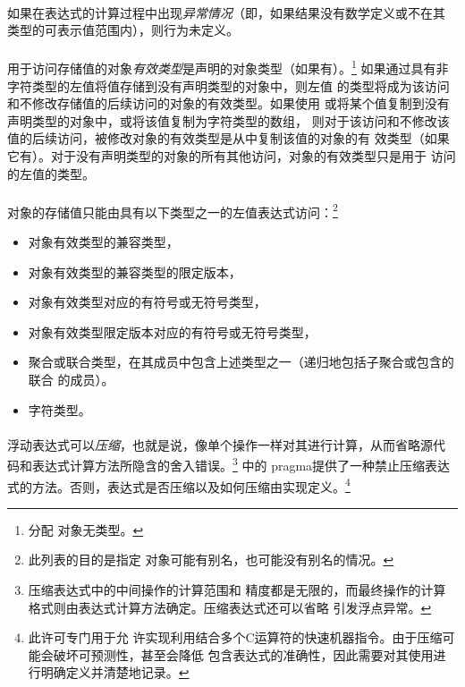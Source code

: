 {\paragraph{}
如果在表达式的计算过程中出现\textit{异常情况}（即，如果结果没有数学定义或不在其
类型的可表示值范围内），则行为未定义。

\paragraph{}
用于访问存储值的对象\textit{有效类型}是声明的对象类型（如果有）。\footnote{分配
对象无类型。} 如果通过具有非字符类型的左值将值存储到没有声明类型的对象中，则左值
的类型将成为该访问和不修改存储值的后续访问的对象的有效类型。如果使用
或将某个值复制到没有声明类型的对象中，或将该值复制为字符类型的数组，
则对于该访问和不修改该值的后续访问，被修改对象的有效类型是从中复制该值的对象的有
效类型（如果它有）。对于没有声明类型的对象的所有其他访问，对象的有效类型只是用于
访问的左值的类型。

\paragraph{}
对象的存储值只能由具有以下类型之一的左值表达式访问：\footnote{此列表的目的是指定
对象可能有别名，也可能没有别名的情况。}
\begin{itemize}
  \item{对象有效类型的兼容类型，}
  \item{对象有效类型的兼容类型的限定版本，}
  \item{对象有效类型对应的有符号或无符号类型，}
  \item{对象有效类型限定版本对应的有符号或无符号类型，}
  \item{聚合或联合类型，在其成员中包含上述类型之一（递归地包括子聚合或包含的联合
    的成员）。}
  \item{字符类型。}
\end{itemize}

\paragraph{}
浮动表达式可以\textit{压缩}，也就是说，像单个操作一样对其进行计算，从而省略源代
码和表达式计算方法所隐含的舍入错误。\footnote{压缩表达式中的中间操作的计算范围和
精度都是无限的，而最终操作的计算格式则由表达式计算方法确定。压缩表达式还可以省略
引发浮点异常。} 中的 pragma提供了一种禁止压缩表达
式的方法。否则，表达式是否压缩以及如何压缩由实现定义。\footnote{此许可专门用于允
许实现利用结合多个C运算符的快速机器指令。由于压缩可能会破坏可预测性，甚至会降低
包含表达式的准确性，因此需要对其使用进行明确定义并清楚地记录。}

}
